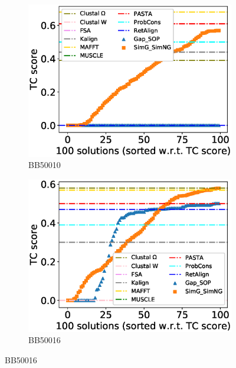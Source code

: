 \begin{figure}[!htbp]
\begin{adjustwidth}{-1.5cm}{-1cm}
		\begin{subfigure}{0.22\textwidth}
			\includegraphics[width=\columnwidth]{Figure/summary/precomputedInit/Balibase/BB50010_tc_density_single_run_2}
			\caption{BB50010}
		\end{subfigure}
		\begin{subfigure}{0.22\textwidth}
			\includegraphics[width=\columnwidth]{Figure/summary/precomputedInit/Balibase/BB50016_tc_density_single_run_2}
			\caption{BB50016}
		\end{subfigure}
		

\end{adjustwidth}
\end{figure}
